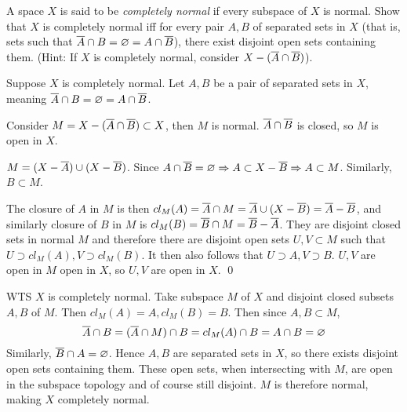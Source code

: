 \documentclass[a4paper, 10pt]{article}
\begin{document}
\begin{problem} 
    A space $X$ is said to be \textit{completely normal} if every subspace of $X$ is normal. Show that $X$ is completely normal iff for every pair $A, B$ of separated sets in $X$ (that is, sets such that $\overline{A} \cap B = \varnothing = A \cap \overline{B}$), there exist disjoint open sets containing them. (Hint: If $X$ is completely normal, consider $X - (\overline{A} \cap \overline{B})$).
\end{problem}
\begin{solution}
    \pffwd Suppose $X$ is completely normal. Let $A, B$ be a pair of separated sets in $X$, meaning $\overline{A} \cap B = \varnothing = A \cap \overline{B}$.

    Consider $M = X - (\overline{A} \cap \overline{B}) \subset X$, then $M$ is normal. $\overline{A} \cap \overline{B}$ is closed, so $M$ is open in $X$.

    $M = (X - \overline{A}) \cup (X - \overline{B})$. Since $A \cap \overline{B} = \varnothing \Rightarrow A \subset X - \overline{B} \Rightarrow A \subset M$. Similarly, $B \subset M$.

    The closure of $A$ in $M$ is then $cl_M(A) = \overline{A} \cap M = \overline{A} \cup (X - \overline{B}) = \overline{A} - \overline{B}$, and similarly closure of $B$ in $M$ is $cl_M(B) = \overline{B} \cap M = \overline{B} - \overline{A}$. They are disjoint closed sets in normal $M$ and therefore there are disjoint open sets $U, V \subset M$ such that $U \supset cl_{M}(A), V \supset cl_{M}(B)$. It then also follows that $U \supset A, V \supset B$. $U, V$ are open in $M$ open in $X$, so $U, V$ are open in $X$. \qed

    \pfbwd WTS $X$ is completely normal. Take subspace $M$ of $X$ and disjoint closed subsets $A, B$ of $M$. Then $cl_M(A) = A, cl_M(B) = B$. Then since $A, B \subset M$,
    \begin{equation*}
        \overline{A} \cap B = (\overline{A} \cap M) \cap B = cl_{M}(A) \cap B = A \cap B = \varnothing
    \end{equation*}
    Similarly, $\overline{B} \cap A = \varnothing$. Hence $A, B$ are separated sets in $X$, so there exists disjoint open sets containing them. These open sets, when intersecting with $M$, are open in the subspace topology and of course still disjoint. $M$ is therefore normal, making $X$ completely normal.
\end{solution}
\end{document}
